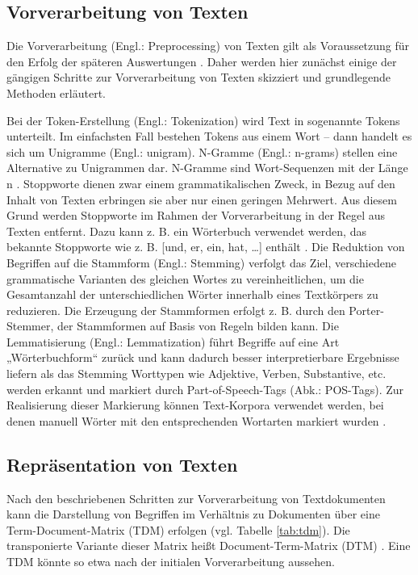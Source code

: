 \subsection{Vorverarbeitung von Texten}

Die Vorverarbeitung (Engl.: Preprocessing) von Texten gilt als Voraussetzung für den Erfolg der späteren Auswertungen \cite[S. 46]{Anandarajan}. Daher werden hier zunächst einige der gängigen Schritte zur Vorverarbeitung von Texten skizziert und grundlegende Methoden erläutert.

Bei der Token-Erstellung (Engl.: Tokenization) wird Text in sogenannte Tokens unterteilt. Im einfachsten Fall bestehen Tokens aus einem Wort – dann handelt es sich um Unigramme (Engl.: unigram). N-Gramme (Engl.: n-grams) stellen eine Alternative zu Unigrammen dar. N-Gramme sind Wort-Sequenzen mit der Länge n \cite[S. 48]{Anandarajan}. Stoppworte dienen zwar einem grammatikalischen Zweck, in Bezug auf den Inhalt von Texten erbringen sie aber nur einen geringen Mehrwert. Aus diesem Grund werden Stoppworte im Rahmen der Vorverarbeitung in der Regel aus Texten entfernt. Dazu kann z. B. ein Wörterbuch verwendet werden, das bekannte Stoppworte wie z. B. [und, er, ein, hat, …] enthält \cite[S. 50-53]{Anandarajan}. Die Reduktion von Begriffen auf die Stammform (Engl.: Stemming) verfolgt das Ziel, verschiedene grammatische Varianten des gleichen Wortes zu vereinheitlichen, um die Gesamtanzahl der unterschiedlichen Wörter innerhalb eines Textkörpers zu reduzieren. Die Erzeugung der Stammformen erfolgt z. B. durch den Porter-Stemmer, der Stammformen auf Basis von Regeln bilden kann. Die Lemmatisierung (Engl.: Lemmatization) führt Begriffe auf eine Art „Wörterbuchform“ zurück und kann dadurch besser interpretierbare Ergebnisse liefern als das Stemming \cite[S. 30-32]{Manning} Worttypen wie Adjektive, Verben, Substantive, etc. werden erkannt und markiert durch Part-of-Speech-Tags (Abk.: POS-Tags). Zur Realisierung dieser Markierung können Text-Korpora verwendet werden, bei denen manuell Wörter mit den entsprechenden Wortarten markiert wurden \cite[S. 58]{Anandarajan}.

\subsection{Repräsentation von Texten} 

Nach den beschriebenen Schritten zur Vorverarbeitung von Textdokumenten kann die Darstellung von Begriffen im Verhältnis zu Dokumenten über eine Term-Document-Matrix (TDM) erfolgen (vgl. Tabelle \ref{tab:tdm}). Die transponierte Variante dieser Matrix heißt Document-Term-Matrix (DTM) \cite[S. 61ff]{Anandarajan}. Eine TDM könnte so etwa nach der initialen Vorverarbeitung aussehen.

